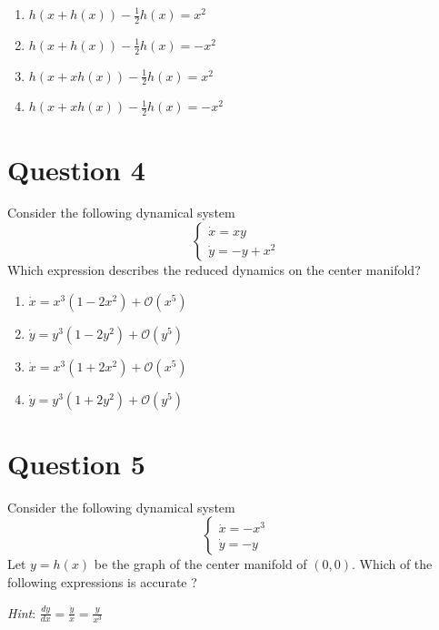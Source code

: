 \documentclass[twoside,10pt,a4paper]{article}
\begin{document}
\begin{enumerate}[label=(\alph*)]
	\item $ \displaystyle h(x + h(x)) - \frac{1}{2}h(x) = x^2 $
	\item $ \displaystyle h(x + h(x)) - \frac{1}{2}h(x) = -x^2 $
	\item $ \displaystyle h(x + xh(x)) - \frac{1}{2}h(x) = x^2 $
	\item $ \displaystyle h(x + xh(x)) - \frac{1}{2}h(x) = -x^2 $
\end{enumerate}

\section*{Question 4}
Consider the following dynamical system
\begin{equation*}
	\begin{cases}
		\dot{x} = xy \\
		\dot{y} = -y + x^2
	\end{cases}
\end{equation*}
Which expression describes the reduced dynamics on the center manifold?

\begin{enumerate}[label=(\alph*)]
	\item $ \dot{x} = x^3(1 - 2x^2) + \mathcal{O}(x^5) $
	\item $ \dot{y} = y^3(1 - 2y^2) + \mathcal{O}(y^5) $
	\item $ \dot{x} = x^3(1 + 2x^2) + \mathcal{O}(x^5) $
	\item $ \dot{y} = y^3(1 + 2y^2) + \mathcal{O}(y^5) $
\end{enumerate}

\section*{Question 5}
Consider the following dynamical system
\begin{equation*}
	\begin{cases}
		\dot{x} = -x^3 \\
		\dot{y} = -y
	\end{cases}
\end{equation*}
Let $y = h(x)$ be the graph of the center manifold of $(0,0)$. Which of the following expressions is accurate ?

\textit{Hint}: $ \displaystyle \frac{dy}{dx} = \frac{\dot{y}}{\dot{x}} = \frac{y}{x^3} $
\end{document}
